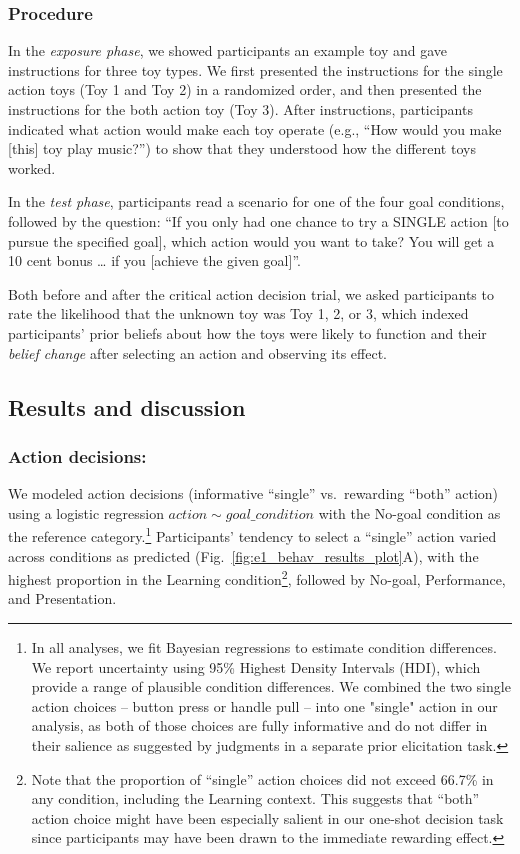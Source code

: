 \documentclass[10pt, letterpaper]{article}
\begin{document}
\subsubsection{Procedure}\label{procedure}

In the \emph{exposure phase}, we showed participants an example toy and
gave instructions for three toy types. We first presented the
instructions for the single action toys (Toy 1 and Toy 2) in a
randomized order, and then presented the instructions for the both
action toy (Toy 3). After instructions, participants indicated what
action would make each toy operate (e.g., ``How would you make
{[}this{]} toy play music?'') to show that they understood how the
different toys worked.

In the \emph{test phase}, participants read a scenario for one of the
four goal conditions, followed by the question: ``If you only had one
chance to try a SINGLE action {[}to pursue the specified goal{]}, which
action would you want to take? You will get a 10 cent bonus \ldots{} if
you {[}achieve the given goal{]}''.

Both before and after the critical action decision trial, we asked
participants to rate the likelihood that the unknown toy was Toy 1, 2,
or 3, which indexed participants' prior beliefs about how the toys were
likely to function and their \emph{belief change} after selecting an
action and observing its effect.

\subsection{Results and discussion}\label{results-and-discussion}

\subsubsection{Action decisions:}\label{action-decisions}

We modeled action decisions (informative ``single'' vs.~rewarding
``both'' action) using a logistic regression
\texttt{$action \sim goal\_condition$} with the No-goal condition as the
reference
category.\footnote{In all analyses, we fit Bayesian regressions to estimate condition differences. We report uncertainty using 95\% Highest Density Intervals (HDI), which provide a range of plausible condition differences. We combined the two single action choices -- button press or handle pull -- into one "single" action in our analysis, as both of those choices are fully informative and do not differ in their salience as suggested by judgments in a separate prior elicitation task.}
Participants' tendency to select a ``single'' action varied across
conditions as predicted (Fig.~\ref{fig:e1_behav_results_plot}A), with
the highest proportion in the Learning condition\footnote{Note that the
  proportion of ``single'' action choices did not exceed 66.7\% in any
  condition, including the Learning context. This suggests that ``both''
  action choice might have been especially salient in our one-shot
  decision task since participants may have been drawn to the immediate
  rewarding effect.}, followed by No-goal, Performance, and
Presentation.
\end{document}
